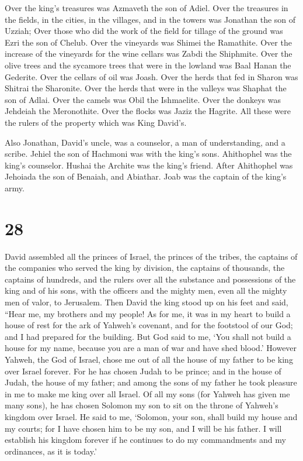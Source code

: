  Over the king's treasures was Azmaveth the son of Adiel.
Over the treasures in the fields, in the cities, in the villages, and in
the towers was Jonathan the son of Uzziah;  Over those
who did the work of the field for tillage of the ground was Ezri the son
of Chelub.  Over the vineyards was Shimei the Ramathite.
Over the increase of the vineyards for the wine cellars was Zabdi the
Shiphmite.  Over the olive trees and the sycamore trees
that were in the lowland was Baal Hanan the Gederite. Over the cellars
of oil was Joash.  Over the herds that fed in Sharon was
Shitrai the Sharonite. Over the herds that were in the valleys was
Shaphat the son of Adlai.  Over the camels was Obil the
Ishmaelite. Over the donkeys was Jehdeiah the Meronothite. Over the
flocks was Jaziz the Hagrite.  All these were the rulers
of the property which was King David's.

 Also Jonathan, David's uncle, was a counselor, a man of
understanding, and a scribe. Jehiel the son of Hachmoni was with the
king's sons.  Ahithophel was the king's counselor. Hushai
the Archite was the king's friend.  After Ahithophel was
Jehoiada the son of Benaiah, and Abiathar. Joab was the captain of the
king's army.

\hypertarget{section-27}{%
\section{28}\label{section-27}}

 David assembled all the princes of Israel, the princes of
the tribes, the captains of the companies who served the king by
division, the captains of thousands, the captains of hundreds, and the
rulers over all the substance and possessions of the king and of his
sons, with the officers and the mighty men, even all the mighty men of
valor, to Jerusalem.  Then David the king stood up on his
feet and said, ``Hear me, my brothers and my people! As for me, it was
in my heart to build a house of rest for the ark of Yahweh's covenant,
and for the footstool of our God; and I had prepared for the building.
 But God said to me, `You shall not build a house for my
name, because you are a man of war and have shed blood.' 
However Yahweh, the God of Israel, chose me out of all the house of my
father to be king over Israel forever. For he has chosen Judah to be
prince; and in the house of Judah, the house of my father; and among the
sons of my father he took pleasure in me to make me king over all
Israel.  Of all my sons (for Yahweh has given me many
sons), he has chosen Solomon my son to sit on the throne of Yahweh's
kingdom over Israel.  He said to me, `Solomon, your son,
shall build my house and my courts; for I have chosen him to be my son,
and I will be his father.  I will establish his kingdom
forever if he continues to do my commandments and my ordinances, as it
is today.'

